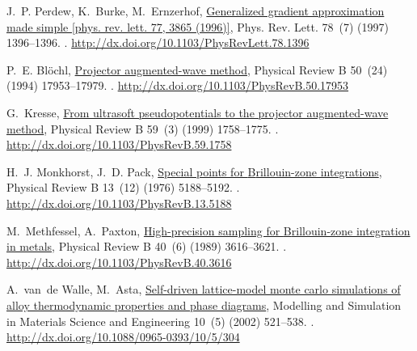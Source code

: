 \documentclass[number, sort&compress, review, 12pt]{elsarticle}
\begin{document}
\begin{thebibliography}{10}
J.~P. Perdew, K.~Burke, M.~Ernzerhof,
  \href{http://dx.doi.org/10.1103/PhysRevLett.78.1396}{Generalized gradient
  approximation made simple [phys. rev. lett. 77, 3865 (1996)]}, Phys. Rev.
  Lett. 78~(7) (1997) 1396--1396.
\newblock \href {http://dx.doi.org/10.1103/physrevlett.78.1396}
  {}.
\newline\urlprefix\url{http://dx.doi.org/10.1103/PhysRevLett.78.1396}

P.~E. Bl\"{o}chl, \href{http://dx.doi.org/10.1103/PhysRevB.50.17953}{Projector
  augmented-wave method}, Physical Review B 50~(24) (1994) 17953--17979.
\newblock \href {http://dx.doi.org/10.1103/physrevb.50.17953}
  {}.
\newline\urlprefix\url{http://dx.doi.org/10.1103/PhysRevB.50.17953}

G.~Kresse, \href{http://dx.doi.org/10.1103/PhysRevB.59.1758}{From ultrasoft
  pseudopotentials to the projector augmented-wave method}, Physical Review B
  59~(3) (1999) 1758--1775.
\newblock \href {http://dx.doi.org/10.1103/physrevb.59.1758}
  {}.
\newline\urlprefix\url{http://dx.doi.org/10.1103/PhysRevB.59.1758}

H.~J. Monkhorst, J.~D. Pack,
  \href{http://dx.doi.org/10.1103/PhysRevB.13.5188}{Special points for
  {B}rillouin-zone integrations}, Physical Review B 13~(12) (1976) 5188--5192.
\newblock \href {http://dx.doi.org/10.1103/physrevb.13.5188}
  {}.
\newline\urlprefix\url{http://dx.doi.org/10.1103/PhysRevB.13.5188}

M.~Methfessel, A.~Paxton,
  \href{http://dx.doi.org/10.1103/PhysRevB.40.3616}{High-precision sampling for
  {B}rillouin-zone integration in metals}, Physical Review B 40~(6) (1989)
  3616--3621.
\newblock \href {http://dx.doi.org/10.1103/physrevb.40.3616}
  {}.
\newline\urlprefix\url{http://dx.doi.org/10.1103/PhysRevB.40.3616}

A.~van~de Walle, M.~Asta,
  \href{http://dx.doi.org/10.1088/0965-0393/10/5/304}{Self-driven lattice-model
  monte carlo simulations of alloy thermodynamic properties and phase
  diagrams}, Modelling and Simulation in Materials Science and Engineering
  10~(5) (2002) 521--538.
\newblock \href {http://dx.doi.org/10.1088/0965-0393/10/5/304}
  {}.
\newline\urlprefix\url{http://dx.doi.org/10.1088/0965-0393/10/5/304}


\end{thebibliography}
\end{document}
